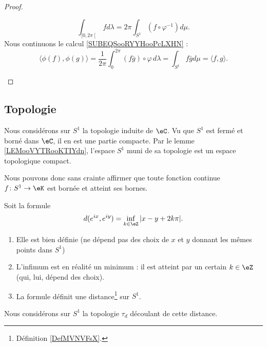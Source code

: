 \begin{proof}
\begin{subproof}
		\begin{equation}
			\int_{\mathopen[ 0 , 2\pi \mathclose[}fd\lambda=2\pi\int_{S^1}(f\circ \varphi^{-1})d\mu.
		\end{equation}
		Nous continuons le calcul \eqref{SUBEQSooRYYHooPcLXHN} :
		\begin{equation}
			\langle \phi(f), \phi(g)\rangle =\frac{1}{ 2\pi }\int_0^{2\pi}(f\bar g)\circ\varphi\, d\lambda=\int_{S^1}f\bar gd\mu=\langle f, g\rangle .
		\end{equation}
	\end{subproof}
\end{proof}

\subsection{Topologie}

Nous considérons sur \( S^1\) la topologie induite de \( \eC\). Vu que \( S^1\) est fermé et borné dans \( \eC\), il en est une partie compacte. Par le lemme \ref{LEMooVYTRooKTIYdn}, l'espace \( S^1\) muni de sa topologie est un espace topologique compact.

Nous pouvons donc sans crainte affirmer que toute fonction continue \( f\colon S^1\to \eK\) est bornée et atteint ses bornes.

\begin{propositionDef}      \label{PROPooEQDBooDfOrTZ}
	Soit la formule
	\begin{equation}
		d( e^{ix},  e^{iy})=\inf_{k\in \eZ}| x-y+2k\pi |.
	\end{equation}
	\begin{enumerate}
		\item
		      Elle est bien définie (ne dépend pas des choix de \( x\) et \( y\) donnant les mêmes points dans \( S^1\))
		\item
		      L'infimum est en réalité un minimum : il est atteint par un certain \( k\in \eZ\) (qui, lui, dépend des choix).
		\item
		      La formule définit une distance\footnote{Définition \ref{DefMVNVFsX}.} sur \( S^1\).
	\end{enumerate}
	Nous considérons sur \( S^1\) la topologie \( \tau_d\) découlant de cette distance.
\end{propositionDef}


